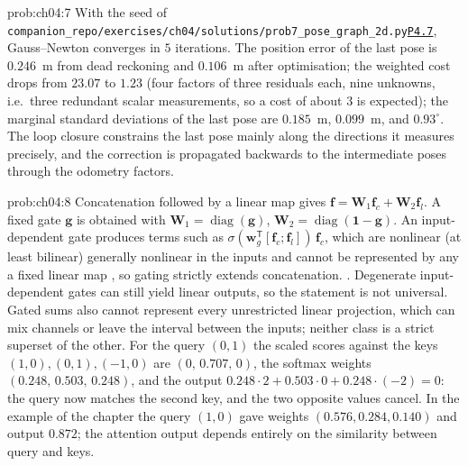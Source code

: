 \documentclass[graybox,envcountchap]{style/SNmono}
\DeclareMathOperator{\diag}{diag}
\newcommand{\repopath}[1]{\texttt{#1}}
\providecommand{\DIFadd}[1]{{\protect\color{blue} #1}} %
\providecommand{\DIFdel}[1]{{\protect\color{red} #1}} %
\providecommand{\DIFaddbegin}{} %
\providecommand{\DIFaddend}{} %
\providecommand{\DIFdelbegin}{} %
\providecommand{\DIFdelend}{} %
\DeclareRobustCommand{\RtwoDel}[1]{{\color{red}%
  \renewcommand{\DIFadd}[1]{##1}\renewcommand{\DIFdel}[1]{##1}%
  #1}}
\DeclareRobustCommand{\RtwoAdd}[1]{{\color{blue}#1}}
\DeclareRobustCommand{\codeentry}[1]{\hyperref[code:#1]{\texttt{#1}}}
\begin{document}
\begin{sol}{prob:ch04:7}
With the seed of \RtwoDel{\repopath{companion\_\allowbreak repo/\allowbreak exercises/\allowbreak ch04/\allowbreak solutions/\allowbreak prob7\_\allowbreak pose\_\allowbreak graph\_\allowbreak 2d.py}}\RtwoAdd{\codeentry{P4.7}}, Gauss--Newton converges in $5$ iterations. The position error of the last pose is $0.246$~m from dead reckoning and $0.106$~m after optimisation; the weighted cost drops from $23.07$ to $1.23$ (four factors of three residuals each, nine unknowns, i.e.\ three redundant scalar measurements, so a cost of about $3$ is expected); the marginal standard deviations of the last pose are $0.185$~m, $0.099$~m, and $0.93^{\circ}$. The loop closure constrains the last pose mainly along the directions it measures precisely, and the correction is propagated backwards to the intermediate poses through the odometry factors.
\end{sol}
\begin{sol}{prob:ch04:8}
Concatenation followed by a linear map gives $\mathbf{f}=\mathbf{W}_1\mathbf{f}_c+\mathbf{W}_2\mathbf{f}_l$. A fixed gate $\mathbf{g}$ is obtained with $\mathbf{W}_1=\diag(\mathbf{g})$, $\mathbf{W}_2=\diag(\mathbf{1}-\mathbf{g})$. An input-dependent gate produces terms such as $\sigma(\mathbf{w}_g^{\mathsf T}[\mathbf{f}_c;\mathbf{f}_l])\,\mathbf{f}_c$, which are \DIFdelbegin \DIFdel{nonlinear (at least bilinear) }\DIFdelend \DIFaddbegin \DIFadd{generally nonlinear }\DIFaddend in the inputs and cannot be represented by \DIFdelbegin \DIFdel{any }\DIFdelend \DIFaddbegin \DIFadd{a }\DIFaddend fixed linear map\DIFdelbegin \DIFdel{, so gating strictly extends concatenation. }\DIFdelend \DIFaddbegin \DIFadd{. Degenerate input-dependent gates can still yield linear outputs, so the statement is not universal. Gated sums also cannot represent every unrestricted linear projection, which can mix channels or leave the interval between the inputs; neither class is a strict superset of the other. }\DIFaddend For the query $(0,1)$ the scaled scores against the keys $(1,0),(0,1),(-1,0)$ are $(0,\,0.707,\,0)$, the softmax weights $(0.248,\,0.503,\,0.248)$, and the output $0.248\cdot2+0.503\cdot0+0.248\cdot(-2)=0$: the query now matches the second key, and the two opposite values cancel. In the example of the chapter the query $(1,0)$ gave weights $(0.576,0.284,0.140)$ and output $0.872$; the attention output depends entirely on the similarity between query and keys.
\end{sol}
\end{document}
